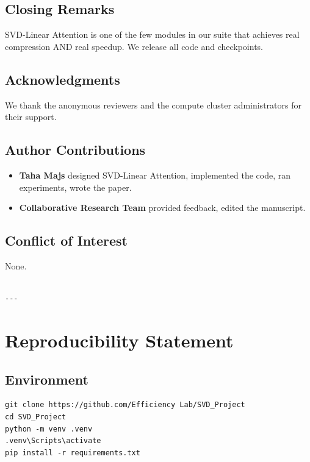 \subsection{Closing Remarks}

SVD-Linear Attention is one of the few modules in our suite that achieves 
real compression AND real speedup. We release all code and checkpoints.

\subsection{Acknowledgments}

We thank the anonymous reviewers and the compute cluster administrators for their support.

\subsection{Author Contributions}

\begin{itemize}
\item \textbf{Taha Majs} designed SVD-Linear Attention, implemented the code,
  ran experiments, wrote the paper.
\item \textbf{Collaborative Research Team} provided feedback, edited the manuscript.

\end{itemize}
\subsection{Conflict of Interest}

None.
\begin{lstlisting}

---
\end{lstlisting}


\section{Reproducibility Statement}

\subsection{Environment}

\begin{lstlisting}
git clone https://github.com/Efficiency Lab/SVD_Project
cd SVD_Project
python -m venv .venv
.venv\Scripts\activate
pip install -r requirements.txt
\end{lstlisting}

